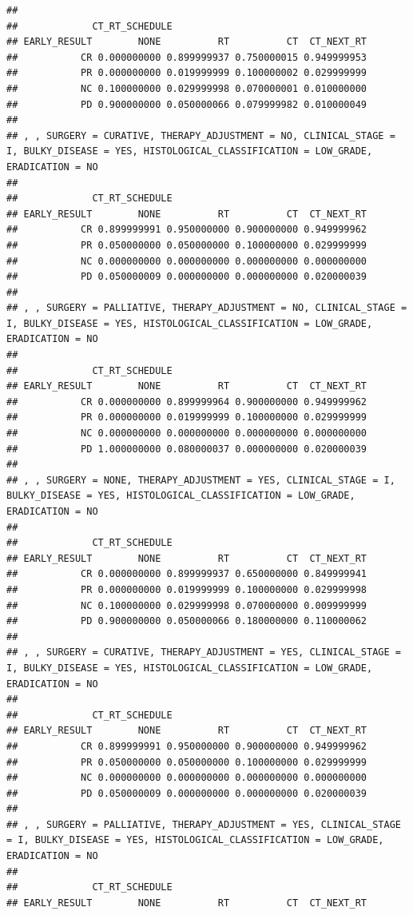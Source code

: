 \documentclass[]{article}
\begin{document}
\begin{verbatim}
## 
##             CT_RT_SCHEDULE
## EARLY_RESULT        NONE          RT          CT  CT_NEXT_RT
##           CR 0.000000000 0.899999937 0.750000015 0.949999953
##           PR 0.000000000 0.019999999 0.100000002 0.029999999
##           NC 0.100000000 0.029999998 0.070000001 0.010000000
##           PD 0.900000000 0.050000066 0.079999982 0.010000049
## 
## , , SURGERY = CURATIVE, THERAPY_ADJUSTMENT = NO, CLINICAL_STAGE = I, BULKY_DISEASE = YES, HISTOLOGICAL_CLASSIFICATION = LOW_GRADE, ERADICATION = NO
## 
##             CT_RT_SCHEDULE
## EARLY_RESULT        NONE          RT          CT  CT_NEXT_RT
##           CR 0.899999991 0.950000000 0.900000000 0.949999962
##           PR 0.050000000 0.050000000 0.100000000 0.029999999
##           NC 0.000000000 0.000000000 0.000000000 0.000000000
##           PD 0.050000009 0.000000000 0.000000000 0.020000039
## 
## , , SURGERY = PALLIATIVE, THERAPY_ADJUSTMENT = NO, CLINICAL_STAGE = I, BULKY_DISEASE = YES, HISTOLOGICAL_CLASSIFICATION = LOW_GRADE, ERADICATION = NO
## 
##             CT_RT_SCHEDULE
## EARLY_RESULT        NONE          RT          CT  CT_NEXT_RT
##           CR 0.000000000 0.899999964 0.900000000 0.949999962
##           PR 0.000000000 0.019999999 0.100000000 0.029999999
##           NC 0.000000000 0.000000000 0.000000000 0.000000000
##           PD 1.000000000 0.080000037 0.000000000 0.020000039
## 
## , , SURGERY = NONE, THERAPY_ADJUSTMENT = YES, CLINICAL_STAGE = I, BULKY_DISEASE = YES, HISTOLOGICAL_CLASSIFICATION = LOW_GRADE, ERADICATION = NO
## 
##             CT_RT_SCHEDULE
## EARLY_RESULT        NONE          RT          CT  CT_NEXT_RT
##           CR 0.000000000 0.899999937 0.650000000 0.849999941
##           PR 0.000000000 0.019999999 0.100000000 0.029999998
##           NC 0.100000000 0.029999998 0.070000000 0.009999999
##           PD 0.900000000 0.050000066 0.180000000 0.110000062
## 
## , , SURGERY = CURATIVE, THERAPY_ADJUSTMENT = YES, CLINICAL_STAGE = I, BULKY_DISEASE = YES, HISTOLOGICAL_CLASSIFICATION = LOW_GRADE, ERADICATION = NO
## 
##             CT_RT_SCHEDULE
## EARLY_RESULT        NONE          RT          CT  CT_NEXT_RT
##           CR 0.899999991 0.950000000 0.900000000 0.949999962
##           PR 0.050000000 0.050000000 0.100000000 0.029999999
##           NC 0.000000000 0.000000000 0.000000000 0.000000000
##           PD 0.050000009 0.000000000 0.000000000 0.020000039
## 
## , , SURGERY = PALLIATIVE, THERAPY_ADJUSTMENT = YES, CLINICAL_STAGE = I, BULKY_DISEASE = YES, HISTOLOGICAL_CLASSIFICATION = LOW_GRADE, ERADICATION = NO
## 
##             CT_RT_SCHEDULE
## EARLY_RESULT        NONE          RT          CT  CT_NEXT_RT

\end{verbatim}
\end{document}
